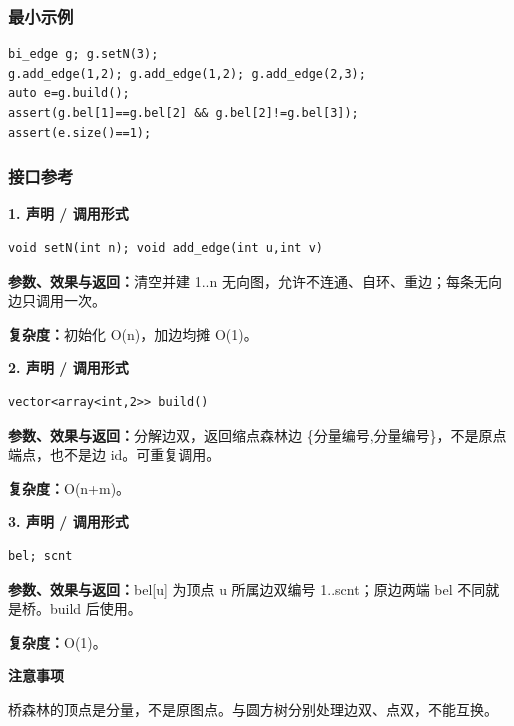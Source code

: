 \documentclass[UTF8,a4paper,10pt]{ctexart}
\newcommand{\TemplNote}[1]{\textbf{注意事项}\par #1\par}
\begin{document}
\subsubsection*{最小示例}
\begin{lstlisting}
bi_edge g; g.setN(3);
g.add_edge(1,2); g.add_edge(1,2); g.add_edge(2,3);
auto e=g.build();
assert(g.bel[1]==g.bel[2] && g.bel[2]!=g.bel[3]);
assert(e.size()==1);
\end{lstlisting}
\subsubsection*{接口参考}
\noindent\begin{minipage}{\textwidth}
\textbf{1. 声明 / 调用形式}
\begin{lstlisting}
void setN(int n); void add_edge(int u,int v)
\end{lstlisting}
\textbf{参数、效果与返回：}清空并建 1..n 无向图，允许不连通、自环、重边；每条无向边只调用一次。

\textbf{复杂度：}初始化 O(n)，加边均摊 O(1)。

\end{minipage}\par\vspace{0.4em}
\noindent\begin{minipage}{\textwidth}
\textbf{2. 声明 / 调用形式}
\begin{lstlisting}
vector<array<int,2>> build()
\end{lstlisting}
\textbf{参数、效果与返回：}分解边双，返回缩点森林边 \{分量编号,分量编号\}，不是原点端点，也不是边 id。可重复调用。

\textbf{复杂度：}O(n+m)。

\end{minipage}\par\vspace{0.4em}
\noindent\begin{minipage}{\textwidth}
\textbf{3. 声明 / 调用形式}
\begin{lstlisting}
bel; scnt
\end{lstlisting}
\textbf{参数、效果与返回：}bel[u] 为顶点 u 所属边双编号 1..scnt；原边两端 bel 不同就是桥。build 后使用。

\textbf{复杂度：}O(1)。

\TemplNote{桥森林的顶点是分量，不是原图点。与圆方树分别处理边双、点双，不能互换。}
\end{minipage}\par\vspace{0.4em}
\clearpage
\end{document}
